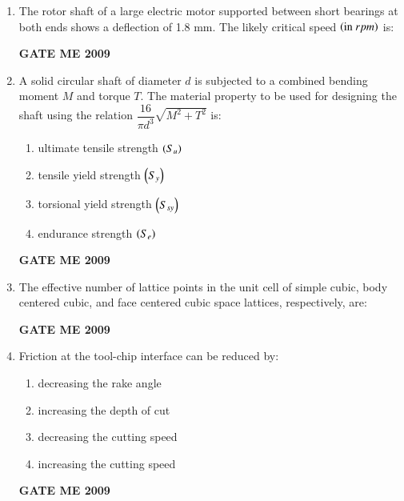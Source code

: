 \documentclass[journal]{IEEEtran}
\begin{document}
\begin{enumerate}[leftmargin=0pt]
\item The rotor shaft of a large electric motor supported between short bearings at both ends shows a deflection of 1.8 mm. The likely critical speed $\left(\text{in} \  rpm\right)$ is:
  \begin{enumerate}
  \end{enumerate}
  \hfill{\textbf{GATE ME 2009}}

\item A solid circular shaft of diameter $d$ is subjected to a combined bending moment $M$ and torque $T$. The material property to be used for designing the shaft using the relation $\dfrac{16}{\pi d^{3}} \sqrt{M^{2} + T^{2}}$ is:
  \begin{enumerate}
    \item ultimate tensile strength $\left(S_u\right)$
    \item tensile yield strength $\left(S_y\right)$
    \item torsional yield strength $\left(S_{sy}\right)$
    \item endurance strength $\left(S_e\right)$
  \end{enumerate}
  \hfill{\textbf{GATE ME 2009}}

\item The effective number of lattice points in the unit cell of simple cubic, body centered cubic, and face centered cubic space lattices, respectively, are:
  \begin{enumerate}
  \end{enumerate}
  \hfill{\textbf{GATE ME 2009}}


\item Friction at the tool-chip interface can be reduced by:
  \begin{enumerate}
    \item decreasing the rake angle
    \item increasing the depth of cut
    \item decreasing the cutting speed
    \item increasing the cutting speed
  \end{enumerate}
  \hfill{\textbf{GATE ME 2009}}



\end{enumerate}
\end{document}
